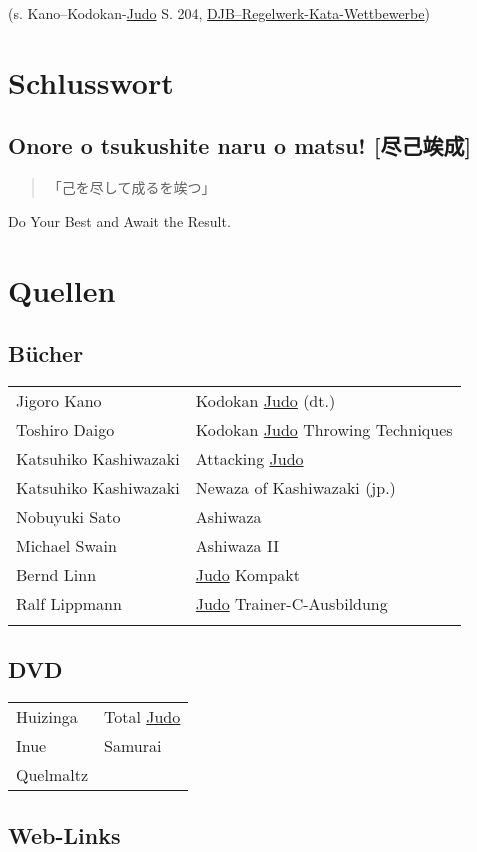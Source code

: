 \documentclass[justified, a4paper, notitlepage, captions=tableheading, nobib]{tufte-handout}
\begin{document}
(s. Kano--Kodokan-\hyperref[org6f56467]{Judo} S. 204, \href{https://www.judobund.de/fileadmin/\_horusdam/897-DJB-Regelwerk\_Kata-Wettbewerbe-IJF2015.pdf}{DJB--Regelwerk-Kata-Wettbewerbe})

\newpage

\section{Schlusswort}
\label{sec:org060bbdf}
\subsection{Onore o tsukushite naru o matsu! [尽己竢成]}
\label{sec:org1de6dd9}
\begin{quote}
「己を尽して成るを竢つ」
\end{quote}

Do Your Best and Await the Result.

\section{Quellen }
\label{sec:orgd1c7d53}

\subsection{Bücher}
\label{sec:orgcc1eca6}

\begin{center}
\begin{tabular}{ll}
Jigoro Kano & Kodokan \hyperref[org6f56467]{Judo} (dt.)\\
Toshiro Daigo & Kodokan \hyperref[org6f56467]{Judo} Throwing Techniques\\
Katsuhiko Kashiwazaki & Attacking \hyperref[org6f56467]{Judo}\\
Katsuhiko Kashiwazaki & Newaza of Kashiwazaki (jp.)\\
Nobuyuki Sato & Ashiwaza\\
Michael Swain & Ashiwaza II\\
Bernd Linn & \hyperref[org6f56467]{Judo} Kompakt\\
Ralf Lippmann & \hyperref[org6f56467]{Judo} Trainer-C-Ausbildung\\
 & \\
\end{tabular}
\end{center}

\subsection{DVD}
\label{sec:org78f58b3}

\begin{center}
\begin{tabular}{ll}
Huizinga & Total \hyperref[org6f56467]{Judo}\\
Inue & Samurai\\
Quelmaltz & \\
\end{tabular}
\end{center}

\subsection{Web-Links}
\label{sec:orge14e0ad}
\end{document}

